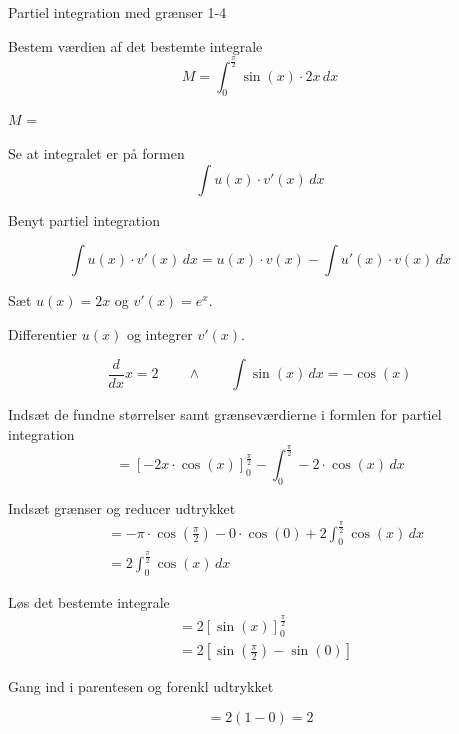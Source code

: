 \documentclass{article}
\begin{document}
\newpage

\begin{exercise}{Partiel integration med grænser 1-4}
	
	
	Bestem værdien af det bestemte integrale
	\[
	M = \int_0^{\frac{\pi}{2}} \sin(x) \cdot 2x \, dx
	\]
	
	$M$ =  \\
	
	
	\hint
	
	Se at integralet er på formen
	\[
	\int u(x) \cdot v'(x) \, dx
	\]
	
	\hint
	
	Benyt partiel integration
	
	\hint
	\[
	\int u(x) \cdot v'(x)\, dx = u(x) \cdot v(x) - \int u'(x) \cdot v(x) \, dx
	\]
	\hint
	
	Sæt $u(x) = 2x$ og $v'(x) = e^x$.
	
	
	\hint
	
	Differentier $u(x)$ og integrer $v'(x)$.
	
	\hint
	\[
	\frac{d}{dx}x = 2 \qquad \wedge \qquad \int \sin(x) \, dx = - \cos(x)
	\]
	
	\hint
	
	Indsæt de fundne størrelser samt grænseværdierne i formlen for partiel integration 
	\[
	= \left[-2x \cdot \cos(x) \right]_{0}^{\frac{\pi}{2}} - \int_{0}^{\frac{\pi}{2}} -2 \cdot \cos(x) \, dx 
	\]
	
	\hint
	
	Indsæt grænser og reducer udtrykket
	\begin{align*}
	&= - \pi \cdot \cos\left(\frac{\pi}{2}\right) - 0 \cdot \cos(0)  + 2 \int_{0}^{\frac{\pi}{2}} \cos(x) \, dx \\
	&=  2 \int_{0}^{\frac{\pi}{2}} \cos(x) \, dx 
	\end{align*}
	
	\hint
	Løs det bestemte integrale
	\begin{align*}
	&= 2 \left[ \sin(x) \right]_0^{\frac{\pi}{2}} \\
	&= 2 \left[ \sin\left(\frac{\pi}{2}\right) - \sin(0)  \right]
	\end{align*}
	
	\hint
	Gang ind i parentesen og forenkl udtrykket
	
	\hint
	\[
	= 2 ( 1 - 0) = 2 	
	\]
	
	
	
\end{exercise}

\newpage
\end{document}
